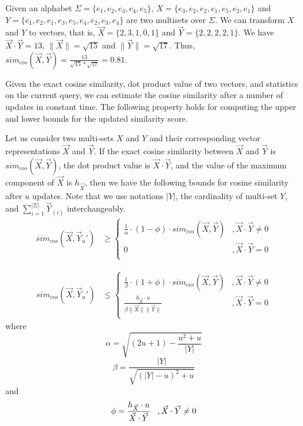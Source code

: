 \begin{example}\label{example:comp-cos}
Given an alphabet $\Sigma=\{e_1, e_2, e_3, e_4, e_5\}$, $X= \{e_3, e_2, e_2, e_1, e_5, e_2, e_1\}$ and $Y = \{e_1, e_2, e_1, e_3, e_5, e_4, e_2, e_3, e_4\}$ are two multisets over $\Sigma$. We can transform $X$ and $Y$ to vectors, that is, $\vec{X} = \{2, 3, 1, 0, 1\}$ and $\vec{Y} = \{2, 2, 2, 2, 1\}$. We have $\vec{X}\cdot \vec{Y} = 13$, $\|\vec{X}\| = \sqrt{15}$ and $\|\vec{Y}\| = \sqrt{17}$. Thus, $sim_{cos}(\vec{X}, \vec{Y}) = \frac{13}{\sqrt{15}*\sqrt{17}} = 0.81$.  
\end{example}

Given the exact cosine similarity, dot product value of two vectors, and statistics on the current query, we can estimate the cosine similarity after a number of updates in constant time. The following property holds for computing the upper and lower bounds for the updated similarity score.

\begin{property}  
Let us consider two multi-sets $X$ and $Y$ and their corresponding vector representations $\vec{X}$ and $\vec{Y}$. If the exact cosine similarity between $\vec{X}$ and $\vec{Y}$ is $sim_{cos}(\vec{X}, \vec{Y})$, the dot product value is $\vec{X}\cdot \vec{Y}$, and the value of the maximum component of $\vec{X}$ is $h_{\vec{X}}$, then we have the following bounds for cosine similarity after $u$ updates. Note that we use notations $|Y|$, the cardinality of multi-set $Y$, and $\sum_{i=1}^{|\Sigma|}\vec{Y}_{(i)}$ interchangeably.
\begin{align*} 
sim_{cos}(\vec{X}, \vec{Y}_u') &\geq 
\begin{cases}
\frac{1}{\alpha} \cdot (1-\phi)\cdot sim_{cos}(\vec{X}, \vec{Y}) & , \vec{X}\cdot \vec{Y} \neq 0\\
0 & , \vec{X}\cdot \vec{Y} = 0\\
\end{cases}
\end{align*}

\begin{align*}
sim_{cos}(\vec{X}, \vec{Y}_u') &\leq 
\begin{cases}
\frac{1}{\beta} \cdot (1+\phi)\cdot sim_{cos}(\vec{X}, \vec{Y}) & , \vec{X}\cdot \vec{Y} \neq 0\\
\frac{h_{\vec{X}}\cdot u}{\beta \|\vec{X}\|\|\vec{Y}\|} & , \vec{X}\cdot \vec{Y} = 0\\
\end{cases}
\end{align*} 
where $$\alpha=\sqrt{(2u+1)-\frac{u^2+u}{|Y|}}$$ 
$$\beta=\frac{|Y|}{\sqrt{(|Y|-u)^2+u}}$$ 
and 
$$\phi = \frac{h_{\vec{X}}\cdot u}{\vec{X}\cdot \vec{Y}}\hspace{3 mm},\vec{X}\cdot \vec{Y} \neq 0$$ 
\end{property}

